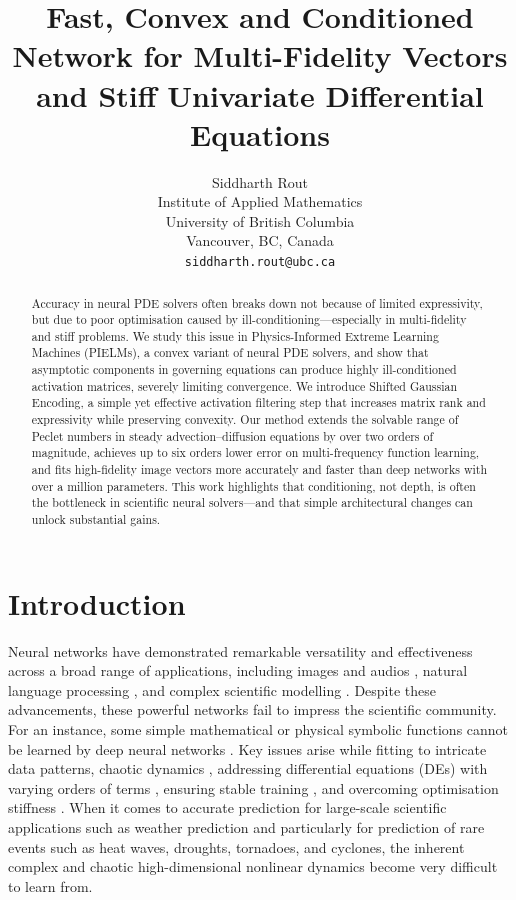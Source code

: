 \documentclass{article}
\title{Fast, Convex and Conditioned Network for Multi-Fidelity Vectors and Stiff Univariate Differential Equations}
\author{Siddharth Rout\\
Institute of Applied Mathematics\\
University of British Columbia\\
Vancouver, BC, Canada \\
\texttt{siddharth.rout@ubc.ca}\\
}
\begin{document}
\maketitle
\begin{abstract}
Accuracy in neural PDE solvers often breaks down not because of limited expressivity, but due to poor optimisation caused by ill-conditioning—especially in multi-fidelity and stiff problems. We study this issue in Physics-Informed Extreme Learning Machines (PIELMs), a convex variant of neural PDE solvers, and show that asymptotic components in governing equations can produce highly ill-conditioned activation matrices, severely limiting convergence. We introduce Shifted Gaussian Encoding, a simple yet effective activation filtering step that increases matrix rank and expressivity while preserving convexity. Our method extends the solvable range of Peclet numbers in steady advection–diffusion equations by over two orders of magnitude, achieves up to six orders lower error on multi-frequency function learning, and fits high-fidelity image vectors more accurately and faster than deep networks with over a million parameters. This work highlights that conditioning, not depth, is often the bottleneck in scientific neural solvers—and that simple architectural changes can unlock substantial gains. 
\end{abstract}




\section{Introduction}
\label{introduction}

Neural networks have demonstrated remarkable versatility and effectiveness across a broad range of applications, including images and audios \cite{8632885,9451544,peebles2023scalable}, natural language processing \cite{peebles2023scalable,chang2024survey,thirunavukarasu2023large}, and complex scientific modelling \cite{thiyagalingam2022scientific,cuomo2022scientific, pathak2022fourcastnet}. 
Despite these advancements, these powerful networks fail to impress the scientific community. For an instance, some simple mathematical or physical symbolic functions cannot be learned by deep neural networks \cite{liu2024kan}. Key issues arise while fitting to intricate data patterns, chaotic dynamics \cite{chattopadhyay2020data}, addressing differential equations (DEs) with varying orders of terms \cite{rout2019numerical,arzani2023theory}, ensuring stable training \cite{Goodfellow-et-al-2016}, and overcoming optimisation stiffness \cite{rout2019numerical}. When it comes to accurate prediction for large-scale scientific applications such as weather prediction and particularly for prediction of rare events such as heat waves, droughts, tornadoes, and cyclones, the inherent complex and chaotic high-dimensional nonlinear dynamics become very difficult to learn from. 
\end{document}
